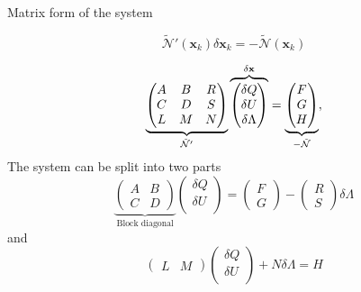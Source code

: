 \documentclass[24pt,t,table, aspectratio=169]{beamer}
\newcommand{\vecx}{\mathbf{x}}
\begin{document}
\begin{frame}{Matrix form of the system}

\begin{framed}
\begin{equation*}
\tilde{\mathcal{N}}'(\vecx_k) \delta \vecx_k = - \tilde{\mathcal{N}}(\vecx_k) 
\end{equation*}
\end{framed}

{
\begin{equation*}
    \underbrace{
    \begin{pmatrix}
        A & B & R\\
        C & D & S\\
        L & M & N
    \end{pmatrix}
    }_{\Tilde{\mathcal{N}}'}
    \overbrace{
    \begin{pmatrix}
        \delta Q\\
        \delta U\\
        \delta \Lambda
    \end{pmatrix}
    }^{\delta \vecx}
    = 
    \underbrace{
    \begin{pmatrix}
        F\\
        G\\
        H
    \end{pmatrix}
    }_{-\Tilde{\mathcal{N}}},
\end{equation*}
}
{
The system can be split into two parts
\begin{equation*}
	\underbrace{
    \begin{pmatrix}
        A & B\\
        C & D
    \end{pmatrix}
    }_{\text{Block diagonal}}
    \begin{pmatrix}
        \delta Q\\
        \delta U\\
    \end{pmatrix}
    =
    \begin{pmatrix}
        F\\
        G
    \end{pmatrix}
    -
    \begin{pmatrix}
        R\\
        S
    \end{pmatrix}
    \delta \Lambda
\end{equation*}
and
\begin{equation*}
    \begin{pmatrix}
        L & M
    \end{pmatrix}
    \begin{pmatrix}
        \delta Q\\
        \delta U\\
    \end{pmatrix}
    + N \delta \Lambda
    = H
\end{equation*}
}


\end{frame}
\end{document}

